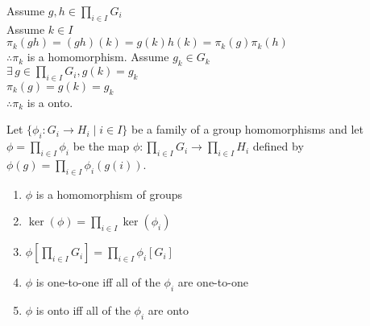 \documentclass[letterpaper,12pt,fleqn]{article}
\newcommand{\p}{\phi}
\newcommand{\xprod}[1]{\prod_{i\in I}#1_i}
\begin{document}
\begin{theproof}
  Assume $g,h\in\xprod{G}$ \\
  Assume $k\in I$ \\
  $\pi_k(gh)=(gh)(k)=g(k)h(k)=\pi_k(g)\pi_k(h)$ \\
  $\therefore\pi_k$ is a homomorphism.
\newpage
  Assume $g_k\in G_k$ \\
  $\exists\,g\in\xprod{G},g(k)=g_k$ \\
  $\pi_k(g)=g(k)=g_k$ \\
  $\therefore\pi_k$ is a onto.
\end{theproof}

\begin{theorem}
  Let $\{\p_i:G_i\to H_i\mid i\in I\}$ be a family of a group homomorphisms
  and let $\p=\prod_{i\in I}\p_i$ be the map $\p:\xprod{G}\to\xprod{H}$
  defined by $\p(g)=\prod_{i\in I}\p_i(g(i))$.
  \begin{enumerate}
  \item $\p$ is a homomorphism of groups
  \item $\ker(\p)=\prod_{i\in I}\ker(\p_i)$
  \item $\p\left[\xprod{G}\right]=\prod_{i\in I}\p_i[G_i]$
  \item $\p$ is one-to-one iff all of the $\p_i$ are one-to-one
  \item $\p$ is onto iff all of the $\p_i$ are onto
  \end{enumerate}
\end{theorem}
\end{document}

